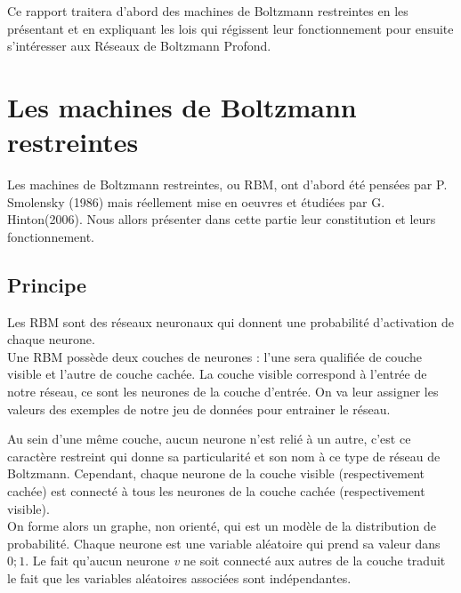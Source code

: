 \documentclass[a4paper,oneside]{report}
\begin{document}
            Ce rapport traitera d'abord des machines de Boltzmann restreintes en les
            présentant et en expliquant les lois qui régissent leur fonctionnement pour
            ensuite s'intéresser aux Réseaux de Boltzmann Profond.

        \chapter{Les machines de Boltzmann restreintes}

            Les machines de Boltzmann restreintes, ou RBM, ont d'abord été
            pensées par P. Smolensky (1986) mais réellement mise en oeuvres et
            étudiées par G.
            Hinton(2006). Nous allors présenter dans cette partie leur constitution et
            leurs fonctionnement.

            \section{Principe}

                Les RBM sont des réseaux neuronaux qui donnent une
                probabilité d'activation de chaque neurone.\\

                Une RBM possède deux couches de neurones : l'une sera qualifiée 
                de couche visible et l'autre de couche cachée.
                La couche visible correspond à l'entrée de notre réseau, ce sont
                les neurones de la couche d'entrée. On va leur assigner les
                valeurs des exemples de notre jeu de données pour entrainer le
                réseau.

                Au sein d'une même couche, aucun neurone n'est relié à un
                autre, c'est ce caractère restreint qui donne sa particularité 
                et son nom à ce type de réseau de Boltzmann.
                Cependant, chaque neurone de la couche visible (respectivement
                cachée) est connecté à tous les neurones de la couche cachée 
                (respectivement visible).\\
                
                On forme alors un graphe, non orienté, qui est un
                modèle de la distribution de probabilité. Chaque neurone est une variable aléatoire
                qui prend sa valeur dans \begin{math}{0;1}\end{math}. Le fait
                qu'aucun neurone \textit{v} ne soit connecté aux autres de la
                couche traduit le fait que les variables aléatoires associées
                sont indépendantes.
                
\end{document}
